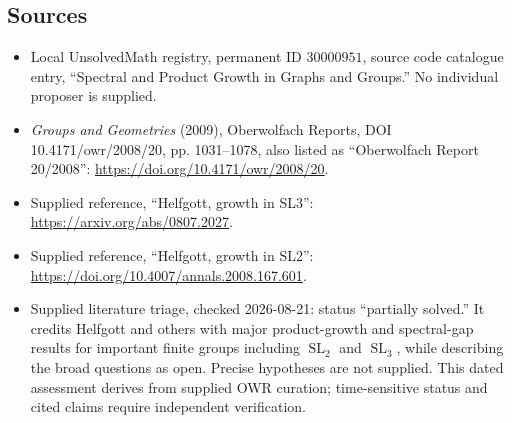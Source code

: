 \documentclass[11pt]{article}
\begin{document}
\subsection{Sources}
\begin{itemize}
\item Local UnsolvedMath registry, permanent ID \(30000951\), source code catalogue entry, ``Spectral and Product Growth in Graphs and Groups.'' No individual proposer is supplied.
\item \emph{Groups and Geometries} (2009), Oberwolfach Reports, DOI 10.4171/owr/2008/20, pp. 1031--1078, also listed as ``Oberwolfach Report 20/2008'': \url{https://doi.org/10.4171/owr/2008/20}.
\item Supplied reference, ``Helfgott, growth in SL3'': \url{https://arxiv.org/abs/0807.2027}.
\item Supplied reference, ``Helfgott, growth in SL2'': \url{https://doi.org/10.4007/annals.2008.167.601}.
\item Supplied literature triage, checked 2026-08-21: status ``partially solved.'' It credits Helfgott and others with major product-growth and spectral-gap results for important finite groups including \(\operatorname{SL}_2\) and \(\operatorname{SL}_3\), while describing the broad questions as open. Precise hypotheses are not supplied. This dated assessment derives from supplied OWR curation; time-sensitive status and cited claims require independent verification.
\end{itemize}
\end{document}
